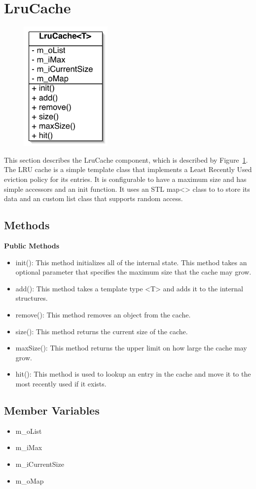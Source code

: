 \section{LruCache}\label{sec:lru}

\begin{figure}
\begin{center}
\includegraphics[width=0.4\textwidth]{figs/lru}
\end{center}
\caption{}
\label{fig:lru}
\end{figure}

This section describes the LruCache component, which is described by Figure~\ref{fig:lru}.  The LRU cache is a simple template class that
implements a Least Recently Used eviction policy for its entries.  It is configurable to have a maximum size and has simple accessors and an
init function.  It uses an STL map<> class to to store its data and an custom list class that supports random access.

\subsection{Methods}

{\bf Public Methods}
\begin{itemize}
\item init(): This method initializes all of the internal state.  This method takes an optional parameter that specifies the maximum size
that the cache may grow.
\item add(): This method takes a template type <T> and adds it to the internal structures.
\item remove(): This method removes an object from the cache.
\item size(): This method returns the current size of the cache.
\item maxSize(): This method returns the upper limit on how large the cache may grow.
\item hit(): This method is used to lookup an entry in the cache and move it to the most recently used if it exists.
\end{itemize}

\subsection{Member Variables}
\begin{itemize}
\item m\_oList
\item m\_iMax
\item m\_iCurrentSize
\item m\_oMap
\end{itemize}
